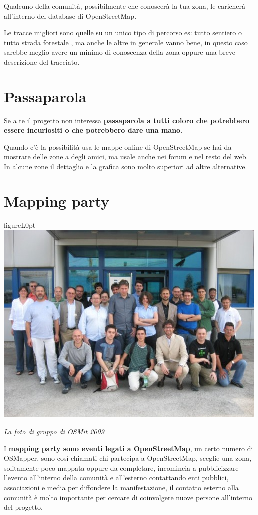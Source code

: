 \documentclass[a4paper,twoside,12pt,]{article}
\newcommand{\osm}{OpenStreetMap\xspace}
\begin{document}
Qualcuno della comunità, possibilmente che conoscerà la tua zona, le caricherà all'interno del database di \osm.

Le tracce migliori sono quelle su un unico tipo di percorso es: tutto sentiero o tutto strada forestale , ma anche le altre in generale vanno bene, in questo caso sarebbe meglio avere un minimo di conoscenza della zona oppure una breve descrizione del tracciato.
\section{Passaparola}
Se a te il progetto non interessa \textbf{passaparola a tutti coloro che potrebbero essere incuriositi o che potrebbero dare una mano}.

Quando c'è la possibilità usa le mappe online di \osm se hai da mostrare delle zone a degli amici, ma usale anche nei forum e nel resto del web. In alcune zone il dettaglio e la grafica sono molto superiori ad altre alternative.
\section{Mapping party}
\begin{wrapfloat}{figure}{L}{0pt}
 \includegraphics[width=0.55\columnwidth]{foto_gruppo_osmit.JPG}
 \caption{\textit{La foto di gruppo di OSMit 2009}}
\end{wrapfloat}
I \textbf{mapping party sono eventi legati a \osm}, un certo numero di OSMapper, sono così chiamati chi partecipa a \osm, sceglie una zona, solitamente poco mappata oppure da completare, incomincia a pubblicizzare l'evento all'interno della comunità e all'esterno contattando enti pubblici, associazioni e media per diffondere la manifestazione, il contatto esterno alla comunità è molto importante per cercare di coinvolgere nuove persone all'interno del progetto.
\end{document}
